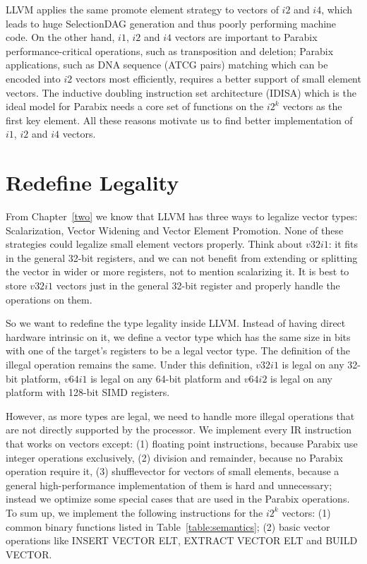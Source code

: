 LLVM applies the same promote element strategy to vectors of $i2$ and $i4$, which leads to huge SelectionDAG generation and thus poorly performing machine code. On the other hand, $i1$, $i2$ and $i4$ vectors are important to Parabix performance-critical operations, such as transposition and deletion; Parabix applications, such as DNA sequence (ATCG pairs) matching which can be encoded into $i2$ vectors most efficiently, requires a better support of small element vectors. The inductive doubling instruction set architecture (IDISA) which is the ideal model for Parabix needs a core set of functions on the $i2^k$ vectors as the first key element. All these reasons motivate us to find better implementation of $i1$, $i2$ and $i4$ vectors.

\section{Redefine Legality}

From Chapter~\ref{two} we know that LLVM has three ways to legalize vector types: Scalarization, Vector Widening and Vector Element Promotion. None of these strategies could legalize small element vectors properly. Think about $v32i1$: it fits in the general 32-bit registers, and we can not benefit from extending or splitting the vector in wider or more registers, not to mention scalarizing it. It is best to store $v32i1$ vectors just in the general 32-bit register and properly handle the operations on them.

So we want to redefine the type legality inside LLVM\@. Instead of having direct hardware intrinsic on it, we define a vector type which has the same size in bits with one of the target's registers to be a legal vector type. The definition of the illegal operation remains the same. Under this definition, $v32i1$ is legal on any 32-bit platform, $v64i1$ is legal on any 64-bit platform and $v64i2$ is legal on any platform with 128-bit SIMD registers.

However, as more types are legal, we need to handle more illegal operations that are not directly supported by the processor. We implement every IR instruction that works on vectors except: (1) floating point instructions, because Parabix use integer operations exclusively, (2) division and remainder, because no Parabix operation require it, (3) shufflevector for vectors of small elements, because a general high-performance implementation of them is hard and unnecessary; instead we optimize some special cases that are used in the Parabix operations. To sum up, we implement the following instructions for the $i2^k$ vectors: (1) common binary functions listed in Table~\ref{table:semantics}; (2) basic vector operations like INSERT VECTOR ELT, EXTRACT VECTOR ELT and BUILD VECTOR\@.

